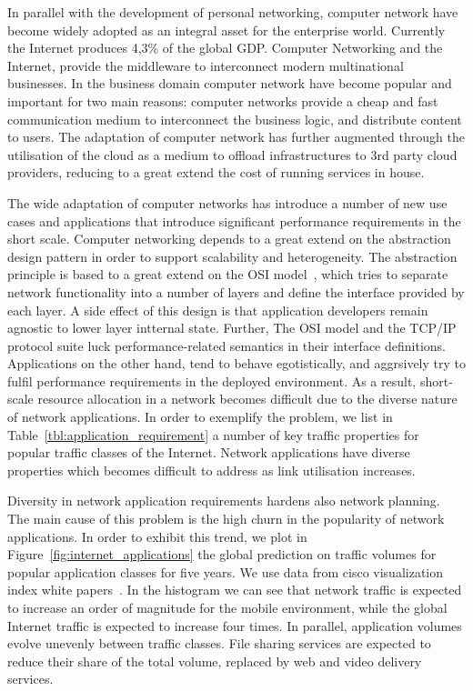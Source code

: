In parallel with the development of personal networking, computer
network have become widely adopted as an integral asset for the enterprise world.  
Currently the
Internet produces 4,3\% of the global GDP. Computer Networking and the Internet,
provide the middleware to interconnect modern multinational businesses. In the
business domain computer network have become popular and important for two main
reasons: computer networks provide a cheap and fast communication medium
to interconnect the business logic, and distribute
content to users. The adaptation of computer network has further augmented
through the utilisation of the cloud as a medium to offload infrastructures to
3rd party cloud providers, reducing to a great extend the cost of running
services in house.

The wide adaptation of computer networks has introduce a number of new use cases
and applications that introduce significant performance requirements in the
short scale. Computer networking depends to a great extend on the abstraction
design pattern in order to support scalability and heterogeneity.  The
abstraction principle is based to a great extend on the OSI
model~\cite{Day:1983vy}, which tries to separate network functionality into a
number of layers and define the interface provided by each layer. A side effect
of this design is that application developers remain agnostic to lower layer
intternal state.  Further, The OSI model and the TCP/IP protocol suite luck
performance-related semantics in their interface definitions.  Applications on
the other hand, tend to behave egotistically, and aggrsively try to fulfil
performance requirements in the deployed environment. As a result, short-scale
resource allocation in a network becomes difficult due to the diverse nature of
network applications. In order to exemplify the problem, we list in
Table~\ref{tbl:application_requirement} a number of key traffic properties for
popular traffic classes of the Internet. Network applications have diverse
properties which becomes difficult to address as link utilisation increases. 

Diversity in network application requirements hardens also network planning.
The main cause of this problem is the high churn in the  popularity of network
applications.  In order to exhibit this trend, we plot in
Figure~\ref{fig:internet_applications} the global prediction on traffic volumes
for popular application classes for five years. We use data from cisco
visualization index white papers~\cite{Mobile:2012vd,Cisco:2012wu}. In the
histogram we can see that network traffic is expected to increase an order of
magnitude for the mobile environment, while the global Internet traffic is
expected to increase four times. In parallel, application volumes evolve
unevenly between traffic classes. File sharing services are expected to reduce
their share of the total volume, replaced by web and video delivery services. 


